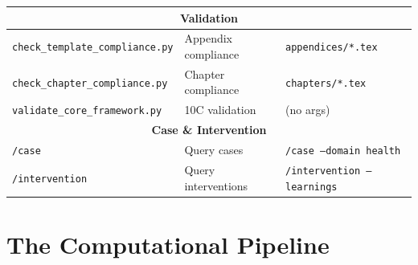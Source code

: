 \begin{tcolorbox}[colback=green!3!white, colframe=green!60!black,
    title=\textbf{Complete Script Reference}]
\begin{longtable}{|l|l|l|}
\hline
\multicolumn{3}{|c|}{\textbf{Validation}} \\
\hline
\texttt{check\_template\_compliance.py} & Appendix compliance & \texttt{appendices/*.tex} \\
\texttt{check\_chapter\_compliance.py} & Chapter compliance & \texttt{chapters/*.tex} \\
\texttt{validate\_core\_framework.py} & 10C validation & (no args) \\
\hline
\multicolumn{3}{|c|}{\textbf{Case \& Intervention}} \\
\hline
\texttt{/case} & Query cases & \texttt{/case --domain health} \\
\texttt{/intervention} & Query interventions & \texttt{/intervention --learnings} \\
\hline
\end{longtable}

\end{tcolorbox}

\section{The Computational Pipeline}
\label{sec:dp-pipeline}

